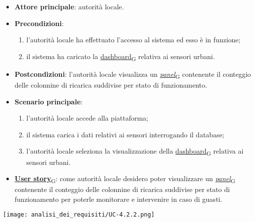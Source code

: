 \begin{itemize}
	\item \textbf{Attore principale}: autorità locale.
	\item \textbf{Precondizioni}:
	      \begin{enumerate}
		      \item l'autorità locale ha effettuato l'accesso al sistema ed esso è in funzione;
		      \item il sistema ha caricato la \href{https://7last.github.io/docs/pb/documentazione-interna/glossario\#dashboard}{dashboard\textsubscript{G}} relativa ai sensori urbani.
	      \end{enumerate}
	\item \textbf{Postcondizioni}: l'autorità locale visualizza un \href{https://7last.github.io/docs/pb/documentazione-interna/glossario\#panel}{\textit{panel}\textsubscript{G}} contenente il conteggio delle colonnine di ricarica suddivise per stato di funzionamento.
	\item \textbf{Scenario principale}:
	      \begin{enumerate}
		      \item l'autorità locale accede alla piattaforma;
		      \item il sistema carica i dati relativi ai sensori interrogando il database;
		      \item l'autorità locale seleziona la visualizzazione della \href{https://7last.github.io/docs/pb/documentazione-interna/glossario\#dashboard}{dashboard\textsubscript{G}} relativa ai sensori urbani.
	      \end{enumerate}
	\item \href{https://7last.github.io/docs/pb/documentazione-interna/glossario\#user-story}{\textbf{User story}\textsubscript{G}}:
	      come autorità locale desidero poter visualizzare un \href{https://7last.github.io/docs/pb/documentazione-interna/glossario\#panel}{\textit{panel}\textsubscript{G}} contenente il conteggio delle colonnine di ricarica suddivise per stato di funzionamento
	      per poterle monitorare e intervenire in caso di guasti.
\end{itemize}
\begin{center}
	\texttt{[image: analisi\_dei\_requisiti/UC-4.2.2.png]}
\end{center}

